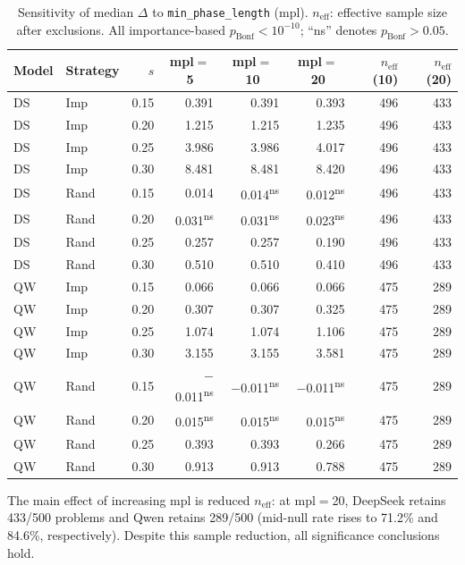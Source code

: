 \begin{table}[t]
\centering
\small
\caption{Sensitivity of median $\Delta$ to \texttt{min\_phase\_length} (mpl). $n_{\text{eff}}$: effective sample size after exclusions. All importance-based $p_{\text{Bonf}} < 10^{-10}$; ``ns'' denotes $p_{\text{Bonf}} > 0.05$.}
\label{tab:mpl-sensitivity}
\begin{tabular}{@{}llrrrrrr@{}}
\toprule
Model & Strategy & $s$ & \multicolumn{1}{c}{mpl$=$5} & \multicolumn{1}{c}{mpl$=$10} & \multicolumn{1}{c}{mpl$=$20} & $n_{\text{eff}}$(10) & $n_{\text{eff}}$(20) \\
\midrule
DS & Imp & 0.15 & 0.391 & 0.391 & 0.393 & 496 & 433 \\
DS & Imp & 0.20 & 1.215 & 1.215 & 1.235 & 496 & 433 \\
DS & Imp & 0.25 & 3.986 & 3.986 & 4.017 & 496 & 433 \\
DS & Imp & 0.30 & 8.481 & 8.481 & 8.420 & 496 & 433 \\
\addlinespace
DS & Rand & 0.15 & 0.014 & 0.014\textsuperscript{ns} & 0.012\textsuperscript{ns} & 496 & 433 \\
DS & Rand & 0.20 & 0.031\textsuperscript{ns} & 0.031\textsuperscript{ns} & 0.023\textsuperscript{ns} & 496 & 433 \\
DS & Rand & 0.25 & 0.257 & 0.257 & 0.190 & 496 & 433 \\
DS & Rand & 0.30 & 0.510 & 0.510 & 0.410 & 496 & 433 \\
\addlinespace
QW & Imp & 0.15 & 0.066 & 0.066 & 0.066 & 475 & 289 \\
QW & Imp & 0.20 & 0.307 & 0.307 & 0.325 & 475 & 289 \\
QW & Imp & 0.25 & 1.074 & 1.074 & 1.106 & 475 & 289 \\
QW & Imp & 0.30 & 3.155 & 3.155 & 3.581 & 475 & 289 \\
\addlinespace
QW & Rand & 0.15 & $-$0.011\textsuperscript{ns} & $-$0.011\textsuperscript{ns} & $-$0.011\textsuperscript{ns} & 475 & 289 \\
QW & Rand & 0.20 & 0.015\textsuperscript{ns} & 0.015\textsuperscript{ns} & 0.015\textsuperscript{ns} & 475 & 289 \\
QW & Rand & 0.25 & 0.393 & 0.393 & 0.266 & 475 & 289 \\
QW & Rand & 0.30 & 0.913 & 0.913 & 0.788 & 475 & 289 \\
\bottomrule
\end{tabular}
\end{table}

The main effect of increasing mpl is reduced $n_{\text{eff}}$: at mpl$=$20, DeepSeek retains 433/500 problems and Qwen retains 289/500 (mid-null rate rises to 71.2\% and 84.6\%, respectively). Despite this sample reduction, all significance conclusions hold.


